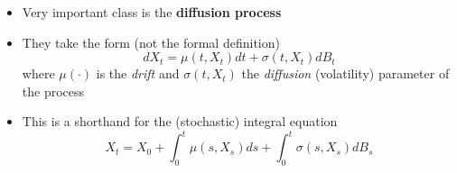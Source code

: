 \documentclass[10pt]{beamer}
\begin{document}
\begin{frame}{}
	
	{\small
		\begin{itemize}
			\item Very important class is the \textbf{diffusion process}
			
			\item They take the form (not the formal definition)
			\begin{equation*}
				dX_t = \mu(t, X_t) dt + \sigma(t, X_t) dB_t
			\end{equation*}
			where $\mu(\cdot)$ is the \textit{drift} and $\sigma(t, X_t)$ the \textit{diffusion} (volatility) parameter of the process 
			
			\item This is a shorthand for the (stochastic) integral equation 
			\begin{equation*}
				X_t = X_0 + \int_0^t \mu(s, X_s) ds + \int_0^t \sigma(s, X_s) dB_s
			\end{equation*}
			
		\end{itemize}
	}
\end{frame}




\appendix
\end{document}
